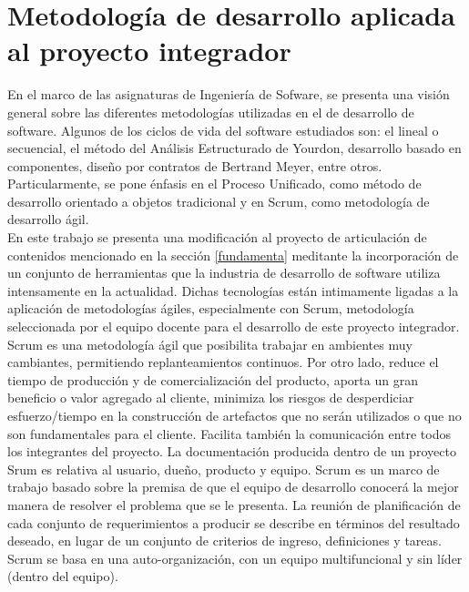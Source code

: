 \section{Metodología de desarrollo aplicada al proyecto integrador} \label{metodologia}
En el marco de las asignaturas de Ingeniería de Sofware, se presenta una visión general sobre las diferentes metodologías utilizadas en 
el de desarrollo de 
software\cite{pressman,jalote}.
Algunos de los ciclos de vida del software estudiados son:  el lineal o secuencial, el método del Análisis Estructurado de Yourdon\cite{yourdon}, 
desarrollo basado en componentes, diseño por contratos\cite{meyer} de Bertrand Meyer, entre otros. 
Particularmente, se pone énfasis en el Proceso Unificado\cite{pu}, como método de desarrollo
orientado a objetos tradicional  y en Scrum\cite{agile}, como metodología de desarrollo ágil.\\ 
En este trabajo se presenta una modificación al proyecto de articulación de contenidos mencionado en la sección
\ref{fundamenta} meditante la 
incorporación de un 
conjunto  de herramientas 
que la industria de desarrollo de software utiliza intensamente en la actualidad. Dichas tecnologías están intimamente ligadas a la 
aplicación de 
metodologías ágiles\cite{metagiles}, especialmente con Scrum, metodología seleccionada por el equipo docente para el desarrollo de este 
proyecto integrador.
Scrum es una metodología ágil que posibilita trabajar en ambientes muy cambiantes, permitiendo replanteamientos continuos. 
Por otro lado, reduce el tiempo de producción y de comercialización del producto, aporta un gran beneficio o 
valor agregado al cliente, minimiza los riesgos de desperdiciar esfuerzo/tiempo en la construcción de artefactos que no serán utilizados 
o que no son fundamentales para el cliente. Facilita también la comunicación entre todos los integrantes del proyecto. 
La documentación producida dentro de un proyecto Srum es relativa al usuario, dueño, producto y equipo.  Scrum es un marco de 
trabajo basado sobre la premisa de que el equipo de desarrollo conocerá la mejor manera de resolver el problema que se le presenta. 
La reunión de planificación de cada conjunto de requerimientos a producir se describe en términos del resultado deseado, 
en lugar de un conjunto de criterios de ingreso, definiciones y tareas. 
Scrum se basa en una auto-organización, con un equipo multifuncional y sin líder (dentro del equipo). 
